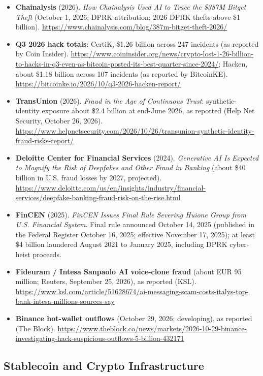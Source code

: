 \documentclass[11pt,letterpaper]{article}
\begin{document}
\begin{itemize}[leftmargin=1.5em]
  \item \textbf{Chainalysis} (2026). \textit{How Chainalysis Used AI to Trace the \$387M Bitget Theft} (October 1, 2026; DPRK attribution; 2026 DPRK thefts above \$1 billion). \url{https://www.chainalysis.com/blog/387m-bitget-theft-2026/}
  \item \textbf{Q3 2026 hack totals}: CertiK, \$1.26 billion across 247 incidents (as reported by Coin Insider). \url{https://www.coininsider.org/news/crypto-lost-1-26-billion-to-hacks-in-q3-even-as-bitcoin-posted-its-best-quarter-since-2024/}; Hacken, about \$1.18 billion across 107 incidents (as reported by BitcoinKE). \url{https://bitcoinke.io/2026/10/q3-2026-hacken-report/}
  \item \textbf{TransUnion} (2026). \textit{Fraud in the Age of Continuous Trust}: synthetic-identity exposure about \$2.4 billion at end-June 2026, as reported (Help Net Security, October 26, 2026). \url{https://www.helpnetsecurity.com/2026/10/26/transunion-synthetic-identity-fraud-risks-report/}
  \item \textbf{Deloitte Center for Financial Services} (2024). \textit{Generative AI Is Expected to Magnify the Risk of Deepfakes and Other Fraud in Banking} (about \$40 billion in U.S. fraud losses by 2027, projected). \url{https://www.deloitte.com/us/en/insights/industry/financial-services/deepfake-banking-fraud-risk-on-the-rise.html}
  \item \textbf{FinCEN} (2025). \textit{FinCEN Issues Final Rule Severing Huione Group from U.S. Financial System}. Final rule announced October 14, 2025 (published in the Federal Register October 16, 2025; effective November 17, 2025); at least \$4 billion laundered August 2021 to January 2025, including DPRK cyber-heist proceeds.
  \item \textbf{Fideuram / Intesa Sanpaolo AI voice-clone fraud} (about EUR 95 million; Reuters, September 25, 2026), as reported (KSL). \url{https://www.ksl.com/article/51628674/ai-messaging-scam-costs-italys-top-bank-intesa-millions-sources-say}
  \item \textbf{Binance hot-wallet outflows} (October 29, 2026; developing), as reported (The Block). \url{https://www.theblock.co/news/markets/2026-10-29-binance-investigating-hack-suspicious-outflows-5-billion-432171}
\end{itemize}

\subsection*{Stablecoin and Crypto Infrastructure}
\end{document}
